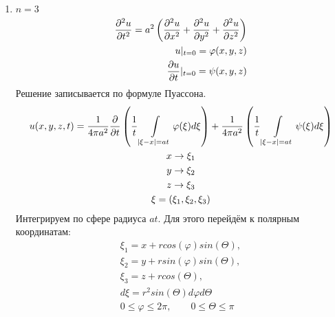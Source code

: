 \documentclass[../main.tex]{subfiles}
\begin{document}
\begin{enumerate}
	\item $n=3$
	      \begin{equation}
		      \label{eq:2.7.2}
		      \begin{split}
			      \frac{\partial ^2u}{\partial t^2} = a^2\left(\frac{\partial ^2u}{\partial x^2}+\frac{\partial ^2u}{\partial y^2}+\frac{\partial ^2u}{\partial z^2}\right)\\
			      u|_{t=0} = \varphi(x,y,z)\\
			      \frac{\partial u}{\partial t}|_{t=0} = \psi(x,y,z)
		      \end{split}
	      \end{equation}
	      Решение записывается по формуле Пуассона.
	      \begin{gather*}
		      u(x,y,z,t) = \frac{1}{4\pi a^2}\frac{\partial  }{\partial t}\left(
		      \frac{1}{t}\int\displaylimits_{|\xi-x|=at} \varphi(\xi)d\xi\right)
		      +
		      \frac{1}{4\pi a^2}\left(
		      \frac{1}{t}\int\displaylimits_{|\xi-x|=at} \psi(\xi)d\xi\right)\\
		      x \rightarrow \xi_1\\
		      y \rightarrow \xi_2\\
		      z \rightarrow \xi_3\\
		      \xi = (\xi_1,\xi_2, \xi_3)
	      \end{gather*}
	      Интегрируем по сфере радиуса $at$. Для этого перейдём к
	      полярным координатам:
	      \begin{gather*}
		      \xi_1 = x + r cos(\varphi) sin(\varTheta), \\
		      \xi_2 = y + r sin(\varphi) sin(\varTheta),\\
		      \xi_3 = z + r cos(\varTheta),\\
		      d\xi = r^2 sin(\varTheta) d\varphi d\varTheta \\
		      0 \leq \varphi \leq 2\pi, \qquad 0 \leq \varTheta \leq \pi
	      \end{gather*}
\end{enumerate}
\end{document}
